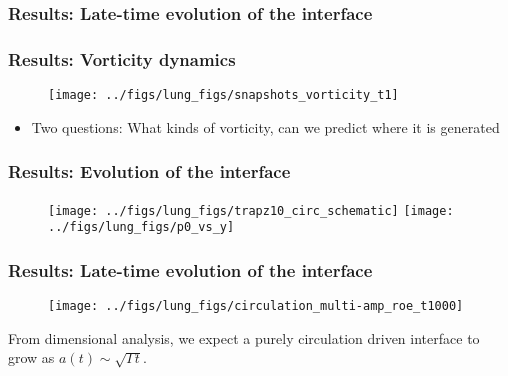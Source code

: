 \begin{frame} \frametitle{\vspace*{0.5cm}Results: Late-time evolution of the interface}
  \begin{figure}
    \centering%
  \end{figure}
\end{frame}
\begin{frame} \frametitle{\vspace*{0.5cm}Results: Vorticity dynamics}
  \begin{figure}
    \centering
    \texttt{[image: ../figs/lung\_figs/snapshots\_vorticity\_t1]}
  \end{figure}
  \begin{itemize}
  \item Two questions: What kinds of vorticity, can we predict where it is generated
  \end{itemize}
\end{frame}
\begin{frame} \frametitle{Results: Evolution of the interface}
  \begin{figure}
    \centering
    \texttt{[image: ../figs/lung\_figs/trapz10\_circ\_schematic]}
    \texttt{[image: ../figs/lung\_figs/p0\_vs\_y]}%
  \end{figure}
\end{frame}
\begin{frame} \frametitle{\vspace*{0.5cm}Results: Late-time evolution of the interface}
  \begin{figure}
    \centering%
    \hfill%
    \texttt{[image: ../figs/lung\_figs/circulation\_multi-amp\_roe\_t1000]}%
  \end{figure}
  {\small
    From dimensional analysis, we expect a purely circulation driven interface to grow as $a(t) \sim \sqrt{\Gamma t}.$
  }

\end{frame}
